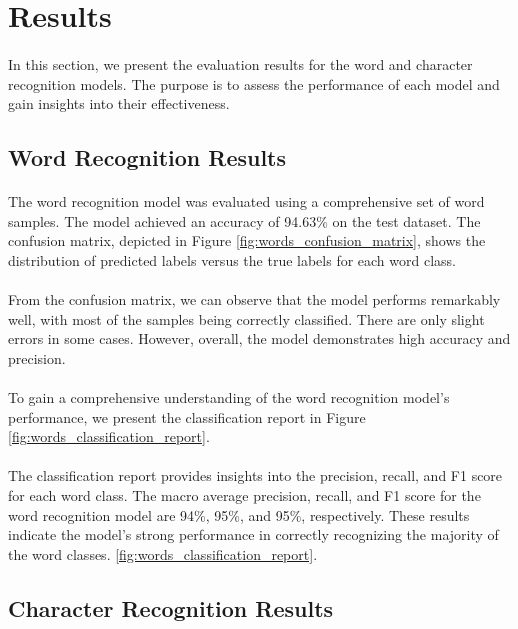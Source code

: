 \section{Results}
\paragraph{}
In this section, we present the evaluation results for the word and character recognition models. The purpose is to assess the performance of each model and gain insights into their effectiveness.
\subsection{Word Recognition Results}
\paragraph{}
The word recognition model was evaluated using a comprehensive set of word samples. The model achieved an accuracy of 94.63\% on the test dataset. The confusion matrix, depicted in Figure \ref{fig:words_confusion_matrix}, shows the distribution of predicted labels versus the true labels for each word class.
\paragraph{}
From the confusion matrix, we can observe that the model performs remarkably well, with most of the samples being correctly classified. There are only slight errors in some cases. However, overall, the model demonstrates high accuracy and precision.
\paragraph{}
To gain a comprehensive understanding of the word recognition model's performance, we present the classification report in Figure \ref{fig:words_classification_report}.
\paragraph{}
The classification report provides insights into the precision, recall, and F1 score for each word class. The macro average precision, recall, and F1 score for the word recognition model are 94\%, 95\%, and 95\%, respectively. These results indicate the model's strong performance in correctly recognizing the majority of the word classes.
 \ref{fig:words_classification_report}.
\subsection{Character Recognition Results}
